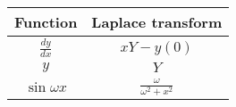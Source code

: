   \begin{tabular}{|c|c|} 
      \hline
\textbf{Function} & \textbf{Laplace transform}\\\hline
         $\frac{dy}{dx}$& $xY-y(0)$ \\\hline
          $y$&$Y$\\\hline
          $\sin{\omega x}$& $\frac{\omega}{\omega^2+x^2}$  \\ \hline
    \end{tabular}
